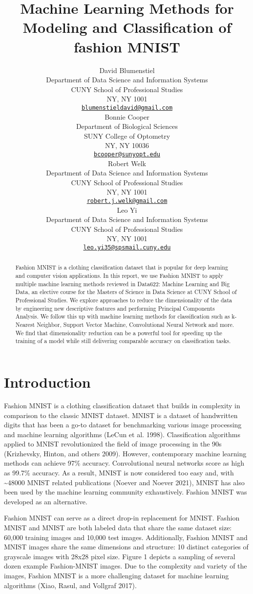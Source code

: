 \documentclass{article}
\title{Machine Learning Methods for Modeling and Classification of
fashion MNIST}
\author{
    David Blumenstiel
   \\
    Department of Data Science and Information Systems \\
    CUNY School of Professional Studies \\
  NY, NY 1001 \\
  \texttt{\href{mailto:blumenstieldavid@gmail.com}{\nolinkurl{blumenstieldavid@gmail.com}}} \\
   \And
    Bonnie Cooper
   \\
    Department of Biological Sciences \\
    SUNY College of Optometry \\
  NY, NY 10036 \\
  \texttt{\href{mailto:bcooper@sunyopt.edu}{\nolinkurl{bcooper@sunyopt.edu}}} \\
   \And
    Robert Welk
   \\
    Department of Data Science and Information Systems \\
    CUNY School of Professional Studies \\
  NY, NY 1001 \\
  \texttt{\href{mailto:robert.j.welk@gmail.com}{\nolinkurl{robert.j.welk@gmail.com}}} \\
   \And
    Leo Yi
   \\
    Department of Data Science and Information Systems \\
    CUNY School of Professional Studies \\
  NY, NY 1001 \\
  \texttt{\href{mailto:leo.yi35@spsmail.cuny.edu}{\nolinkurl{leo.yi35@spsmail.cuny.edu}}} \\
  }
\begin{document}
\maketitle

\def\tightlist{}


\begin{abstract}
Fashion MNIST is a clothing classification dataset that is popular for
deep learning and computer vision applications. In this report, we use
Fashion MNIST to apply multiple machine learning methods reviewed in
Data622: Machine Learning and Big Data, an elective course for the
Masters of Science in Data Science at CUNY School of Professional
Studies. We explore approaches to reduce the dimensionality of the data
by engineering new descriptive features and performing Principal
Components Analysis. We follow this up with machine learning methods for
classification such as k-Nearest Neighbor, Support Vector Machine,
Convolutional Neural Network and more. We find that dimensionality
reduction can be a powerful tool for speeding up the training of a model
while still delivering comparable accuracy on classification tasks.
\end{abstract}


\hypertarget{introduction}{%
\section{Introduction}\label{introduction}}

Fashion MNIST is a clothing classification dataset that builds in
complexity in comparison to the classic MNIST dataset. MNIST is a
dataset of handwritten digits that has been a go-to dataset for
benchmarking various image processing and machine learning algorithms
(LeCun et al. 1998). Classification algorithms applied to MNIST
revolutionized the field of image processing in the 90s (Krizhevsky,
Hinton, and others 2009). However, contemporary machine learning methods
can achieve 97\% accuracy. Convolutional neural networks score as high
as 99.7\% accuracy. As a result, MNIST is now considered too easy and,
with \textasciitilde48000 MNIST related publications (Noever and Noever
2021), MNIST has also been used by the machine learning community
exhaustively. Fashion MNIST was developed as an alternative.

Fashion MNIST can serve as a direct drop-in replacement for MNIST.
Fashion MNIST and MNIST are both labeled data that share the same
dataset size: 60,000 training images and 10,000 test images.
Additionally, Fashion MNIST and MNIST images share the same dimensions
and structure: 10 distinct categories of grayscale images with 28x28
pixel size. Figure 1 depicts a sampling of several dozen example
Fashion-MNIST images. Due to the complexity and variety of the images,
Fashion MNIST is a more challenging dataset for machine learning
algorithms (Xiao, Rasul, and Vollgraf 2017).
\end{document}
